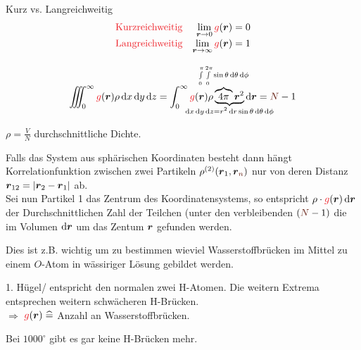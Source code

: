 \begin{notebox}
  \begin{numberlist}
      \item Kurz vs. Langreichweitig
        \begin{align}
          &\rd{\text{Kurzreichweitig}}&\lim_{\rvec\to0}\rd{g}(\rvec)=0\nalign
          &\rd{\text{Langreichweitig}}&\lim_{\rvec\to\infty}\rd{g}(\rvec)=1
        \end{align}
      \item 
        \begin{align}
          \iiint_{0}^{\infty}\rd{g}(\rvec)\rho\diff x\diff y\diff
          z=\int_{0}^{\infty}\rd{g}(\rvec)\rho\underbrace{\overbrace{4\pi}^{\mathclap{\int\limits_{0}^{\pi}\int\limits_{0}^{2\pi}\sin\theta\diff\theta\diff\phi}}\rvec^2}_{\mathclap{\diff x\diff y\diff z=r^2\diff r\sin\theta\diff\theta\diff\phi}}\diff\rvec=\idxN-1
        \end{align}
  \end{numberlist}
\end{notebox}
\begin{notebox}[Bemerkungen]
  \begin{numberlist}
      \item $\rho=\frac{V}{N}$ durchschnittliche Dichte.
      \item Falls das System aus sphärischen Koordinaten besteht dann hängt Korrelationfunktion zwischen zwei Partikeln $\rho^{(2)}(\rvec_1,\rvec_{\idxn})$ nur
    von deren Distanz $\boldsymbol r _{12}=\lvert\boldsymbol r _2-\boldsymbol r _1\rvert$ ab.\\
    Sei nun Partikel 1 das Zentrum des Koordinatensystems, so entspricht $\rho\cdot\rd{g}(\rvec)\diff\rvec$ der Durchschnittlichen Zahl der Teilchen (unter den
    verbleibenden $(\idxN-1)$ die im Volumen $\diff\rvec$ um das Zentum $\boldsymbol r $ gefunden werden.
      \item Dies ist z.B. wichtig um zu bestimmen wieviel Wasserstoffbrücken im Mittel zu einem $O$-Atom in wässiriger Lösung gebildet werden.
  \end{numberlist}
\end{notebox}
\begin{sectionbox}\nospacing
  \hspace{-1em}\begin{figure}[H]	
    \centering{
      \def\svgwidth{100pt}
      \resizebox{0.6\linewidth}{!}{}
    }
  \end{figure}
  1. Hügel/ entspricht den normalen zwei H-Atomen. Die weitern Extrema entsprechen weitern schwächeren H-Brücken.\\
  $\Rightarrow$ $\rd{g}(\rvec)\corresponds$ Anzahl an Wasserstoffbrücken.
  \begin{notebox}[Spezialfall]
    Bei $1000^{\circ}$ gibt es gar keine H-Brücken mehr.
  \end{notebox}
\end{sectionbox}
\begin{notebox}[Bemerkung]
\end{notebox}
